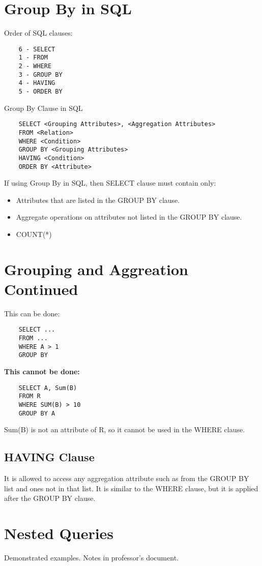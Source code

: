 \documentclass[twoside]{article}
\begin{document}
\section*{Group By in SQL}

Order of SQL clauses:
\begin{verbatim}
    6 - SELECT
    1 - FROM
    2 - WHERE
    3 - GROUP BY
    4 - HAVING
    5 - ORDER BY
\end{verbatim}

Group By Clause in SQL
\begin{verbatim}
    SELECT <Grouping Attributes>, <Aggregation Attributes>
    FROM <Relation>
    WHERE <Condition>
    GROUP BY <Grouping Attributes>
    HAVING <Condition>
    ORDER BY <Attribute>
\end{verbatim}

If using Group By in SQL, then SELECT clause must contain only:
\begin{itemize}
    \item Attributes that are listed in the GROUP BY clause.
    \item Aggregate operations on attributes not listed in the GROUP BY clause.
    \item COUNT(*)
\end{itemize}

\newpage
\hfill \break
{}

\section*{Grouping and Aggreation Continued}

This can be done:
\begin{verbatim}
    SELECT ...
    FROM ... 
    WHERE A > 1
    GROUP BY
\end{verbatim}

\textbf{This cannot be done:}
\begin{verbatim}
    SELECT A, Sum(B)
    FROM R
    WHERE SUM(B) > 10
    GROUP BY A
\end{verbatim}
Sum(B) is not an attribute of R, so it cannot be used in the WHERE clause.

\subsection*{HAVING Clause}
It is allowed to access any aggregation attribute such as from the GROUP BY
list and ones not in that list. It is similar to the WHERE clause, but it 
is applied after the GROUP BY clause.

\section*{Nested Queries}
Demonstrated examples. Notes in professor's document.
\end{document}
